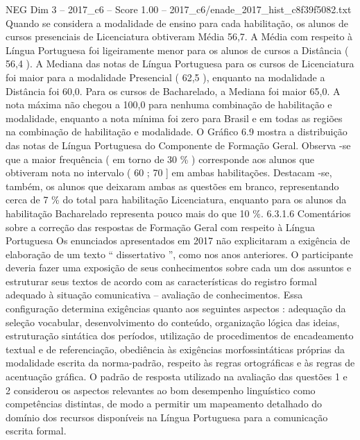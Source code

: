 \begin{textsample}{NEG Dim 3 – 2017\_c6 – Score 1.00 – 2017\_c6/enade\_2017\_hist\_c8f39f5082.txt}
Quando se considera a modalidade de ensino para cada habilitação, os alunos de cursos presenciais de Licenciatura obtiveram Média 56,7.
A Média com respeito à Língua Portuguesa foi ligeiramente menor para os alunos de cursos a Distância ( 56,4 ).
A Mediana das notas de Língua Portuguesa para os cursos de Licenciatura foi maior para a modalidade Presencial ( 62,5 ), enquanto na modalidade a Distância foi 60,0.
Para os cursos de Bacharelado, a Mediana foi maior 65,0.
A nota máxima não chegou a 100,0 para nenhuma combinação de habilitação e modalidade, enquanto a nota mínima foi zero para Brasil e em todas as regiões na combinação de habilitação e modalidade.
O Gráfico 6.9 mostra a distribuição das notas de Língua Portuguesa do Componente de Formação Geral.
Observa -se que a maior frequência ( em torno de 30 \% ) corresponde aos alunos que obtiveram nota no intervalo ( 60 ; 70 ] em ambas habilitações.
Destacam -se, também, os alunos que deixaram ambas as questões em branco, representando cerca de 7 \% do total para habilitação Licenciatura, enquanto para os alunos da habilitação Bacharelado representa pouco mais do que 10 \%. 6.3.1.6 Comentários sobre a correção das respostas de Formação Geral com respeito à Língua Portuguesa Os enunciados apresentados em 2017 não explicitaram a exigência de elaboração de um texto “ dissertativo ”, como nos anos anteriores.
O participante deveria fazer uma exposição de seus conhecimentos sobre cada um dos assuntos e estruturar seus textos de acordo com as características do registro formal adequado à situação comunicativa – avaliação de conhecimentos.
Essa configuração determina exigências quanto aos seguintes aspectos : adequação da seleção vocabular, desenvolvimento do conteúdo, organização lógica das ideias, estruturação sintática dos períodos, utilização de procedimentos de encadeamento textual e de referenciação, obediência às exigências morfossintáticas próprias da modalidade escrita da norma-padrão, respeito às regras ortográficas e às regras de acentuação gráfica.
O padrão de resposta utilizado na avaliação das questões 1 e 2 considerou os aspectos relevantes ao bom desempenho linguístico como competências distintas, de modo a permitir um mapeamento detalhado do domínio dos recursos disponíveis na Língua Portuguesa para a comunicação escrita formal.

\end{textsample}
